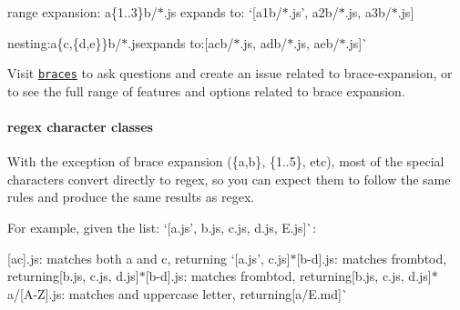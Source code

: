 \begin{DoxyItemize}
\item range expansion\+: {\ttfamily a\{1..3\}b/$\ast$.js} expands to\+: `\mbox{[}\textquotesingle{}a1b/$\ast$.js', \textquotesingle{}a2b/$\ast$.js\textquotesingle{}, \textquotesingle{}a3b/$\ast$.js\textquotesingle{}\mbox{]}{\ttfamily }
\item {\ttfamily nesting\+:}a\{c,\{d,e\}\}b/$\ast$.js{\ttfamily expands to\+:}\mbox{[}\textquotesingle{}acb/$\ast$.js\textquotesingle{}, \textquotesingle{}adb/$\ast$.js\textquotesingle{}, \textquotesingle{}aeb/$\ast$.js\textquotesingle{}\mbox{]}\`{}
\end{DoxyItemize}

Visit \href{https://github.com/jonschlinkert/braces}{\tt braces} to ask questions and create an issue related to brace-\/expansion, or to see the full range of features and options related to brace expansion.

\paragraph*{regex character classes}

With the exception of brace expansion ({\ttfamily \{a,b\}}, {\ttfamily \{1..5\}}, etc), most of the special characters convert directly to regex, so you can expect them to follow the same rules and produce the same results as regex.

For example, given the list\+: `\mbox{[}\textquotesingle{}a.\+js', \textquotesingle{}b.\+js\textquotesingle{}, \textquotesingle{}c.\+js\textquotesingle{}, \textquotesingle{}d.\+js\textquotesingle{}, \textquotesingle{}E.\+js\textquotesingle{}\mbox{]}\`{}\+:


\begin{DoxyItemize}
\item {\ttfamily \mbox{[}ac\mbox{]}.js}\+: matches both {\ttfamily a} and {\ttfamily c}, returning `\mbox{[}\textquotesingle{}a.\+js', \textquotesingle{}c.\+js\textquotesingle{}\mbox{]}{\ttfamily  $\ast$}\mbox{[}b-\/d\mbox{]}.js{\ttfamily \+: matches from}b{\ttfamily to}d{\ttfamily , returning}\mbox{[}\textquotesingle{}b.\+js\textquotesingle{}, \textquotesingle{}c.\+js\textquotesingle{}, \textquotesingle{}d.\+js\textquotesingle{}\mbox{]}{\ttfamily  $\ast$}\mbox{[}b-\/d\mbox{]}.js{\ttfamily \+: matches from}b{\ttfamily to}d{\ttfamily , returning}\mbox{[}\textquotesingle{}b.\+js\textquotesingle{}, \textquotesingle{}c.\+js\textquotesingle{}, \textquotesingle{}d.\+js\textquotesingle{}\mbox{]}{\ttfamily  $\ast$}a/\mbox{[}A-\/Z\mbox{]}.js{\ttfamily \+: matches and uppercase letter, returning}\mbox{[}\textquotesingle{}a/\+E.\+md\textquotesingle{}\mbox{]}\`{}
\end{DoxyItemize}

